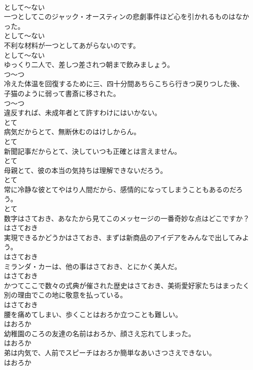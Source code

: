 \documentclass[8pt]{extreport}
\begin{document}
\begin{CJK}{UTF8}{min}
\\	として～ない
\\	一つとしてこのジャック・オースティンの悲劇事件ほど心を引かれるものはなかった。	
\\	として～ない
\\	不利な材料が一つとしてあがらないのです。	
\\	として～ない
\\	ゆっくり二人で、差しつ差されつ朝まで飲みましょう。	
\\	つ～つ
\\	冷えた体温を回復するために三、四十分間あちらこちら行きつ戻りつした後、子猫のように弱って書斎に移された。	
\\	つ～つ
\\	違反すれば、未成年者とて許すわけにはいかない。	
\\	とて
\\	病気だからとて、無断休むのはけしからん。	
\\	とて
\\	新聞記事だからとて、決していつも正確とは言えません。	
\\	とて
\\	母親とて、彼の本当の気持ちは理解できないだろう。	
\\	とて
\\	常に冷静な彼とてやはり人間だから、感情的になってしまうこともあるのだろう。	
\\	とて
\\	数字はさておき、あなたから見てこのメッセージの一番奇妙な点はどこですか？	
\\	はさておき
\\	実現できるかどうかはさておき、まずは新商品のアイデアをみんなで出してみよう。	
\\	はさておき
\\	ミランダ・カーは、他の事はさておき、とにかく美人だ。	
\\	はさておき
\\	かつてここで数々の式典が催された歴史はさておき、美術愛好家たちはまったく別の理由でこの地に敬意を払っている。	
\\	はさておき
\\	腰を痛めてしまい、歩くことはおろか立つことも難しい。	
\\	はおろか
\\	幼稚園のころの友達の名前はおろか、顔さえ忘れてしまった。	
\\	はおろか
\\	弟は内気で、人前でスピーチはおろか簡単なあいさつさえできない。	
\\	はおろか

\end{CJK}
\end{document}
